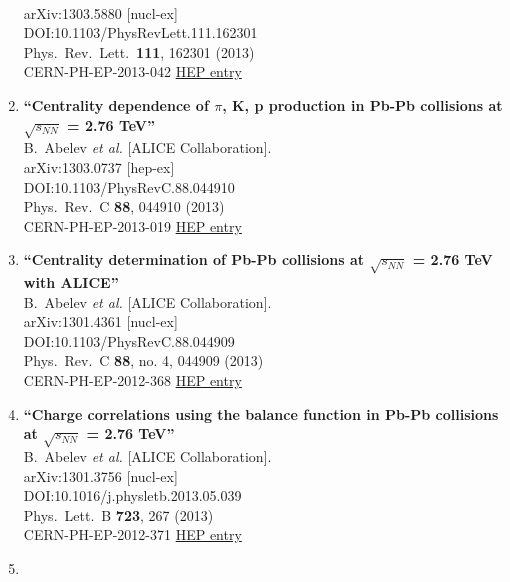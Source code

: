 \begin{enumerate}
  \\{}arXiv:1303.5880 [nucl-ex]
  \\{}DOI:10.1103/PhysRevLett.111.162301
  \\{}Phys.\ Rev.\ Lett.\  {\bf 111}, 162301 (2013)
  \\{}CERN-PH-EP-2013-042
\href{http://inspirehep.net/record/1225273}{HEP entry}
\item%
{\bf ``Centrality dependence of $\pi$, K, p production in Pb-Pb collisions at $\sqrt{s_{NN}}$ = 2.76 TeV''}
  \\{}B.~Abelev {\it et al.} [ALICE Collaboration].
  \\{}arXiv:1303.0737 [hep-ex]
  \\{}DOI:10.1103/PhysRevC.88.044910
  \\{}Phys.\ Rev.\ C {\bf 88}, 044910 (2013)
  \\{}CERN-PH-EP-2013-019
\href{http://inspirehep.net/record/1222333}{HEP entry}
\item%
{\bf ``Centrality determination of Pb-Pb collisions at $\sqrt{s_{NN}}$ = 2.76 TeV with ALICE''}
  \\{}B.~Abelev {\it et al.} [ALICE Collaboration].
  \\{}arXiv:1301.4361 [nucl-ex]
  \\{}DOI:10.1103/PhysRevC.88.044909
  \\{}Phys.\ Rev.\ C {\bf 88}, no. 4, 044909 (2013)
  \\{}CERN-PH-EP-2012-368
\href{http://inspirehep.net/record/1215085}{HEP entry}
\item%
{\bf ``Charge correlations using the balance function in Pb-Pb collisions at $\sqrt{s_{NN}}$ = 2.76 TeV''}
  \\{}B.~Abelev {\it et al.} [ALICE Collaboration].
  \\{}arXiv:1301.3756 [nucl-ex]
  \\{}DOI:10.1016/j.physletb.2013.05.039
  \\{}Phys.\ Lett.\ B {\bf 723}, 267 (2013)
  \\{}CERN-PH-EP-2012-371
\href{http://inspirehep.net/record/1211186}{HEP entry}
\item%

\end{enumerate}
